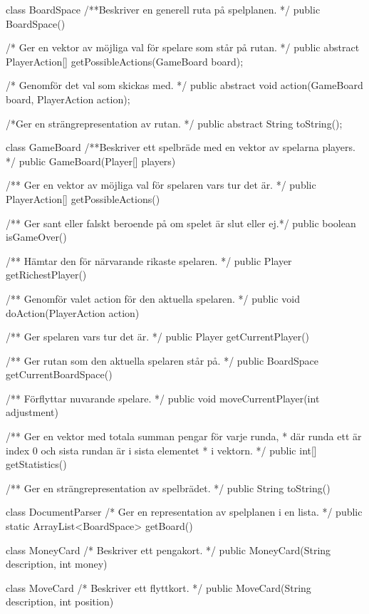 \begin{JavaSpec}{class BoardSpace}
/**Beskriver en generell ruta på spelplanen. */
public BoardSpace()

/* Ger en vektor av möjliga val för spelare som står på rutan. */
public abstract PlayerAction[] getPossibleActions(GameBoard board);

/* Genomför det val som skickas med. */
public abstract void action(GameBoard board, PlayerAction action);

/*Ger en strängrepresentation av rutan. */
public abstract String toString();
\end{JavaSpec}

\begin{JavaSpec}{class GameBoard}
/**Beskriver ett spelbräde med en vektor av spelarna players. */
public GameBoard(Player[] players) 

/** Ger en vektor av möjliga val för spelaren vars tur det är. */
public PlayerAction[] getPossibleActions()

/** Ger sant eller falskt beroende på om spelet är slut eller ej.*/
public boolean isGameOver()

/** Hämtar den för närvarande rikaste spelaren. */
public Player getRichestPlayer()

/** Genomför valet action för den aktuella spelaren. */
public void doAction(PlayerAction action)

/** Ger spelaren vars tur det är. */
public Player getCurrentPlayer()

/** Ger rutan som den aktuella spelaren står på. */
public BoardSpace getCurrentBoardSpace()

/** Förflyttar nuvarande spelare. */
public void moveCurrentPlayer(int adjustment)

/** Ger en vektor med totala summan pengar för varje runda,
 * där runda ett är index 0 och sista rundan är i sista elementet 
 * i vektorn.  */
public int[] getStatistics()

/** Ger en strängrepresentation av spelbrädet. */
public String toString()
\end{JavaSpec}

\begin{JavaSpec}{class DocumentParser}
/* Ger en representation av spelplanen i en lista. */
public static ArrayList<BoardSpace> getBoard()
\end{JavaSpec}

\begin{JavaSpec}{class MoneyCard}
/* Beskriver ett pengakort. */
public MoneyCard(String description, int money)
\end{JavaSpec}
\begin{JavaSpec}{class MoveCard}
/* Beskriver ett flyttkort. */
public MoveCard(String description, int position)
\end{JavaSpec}

